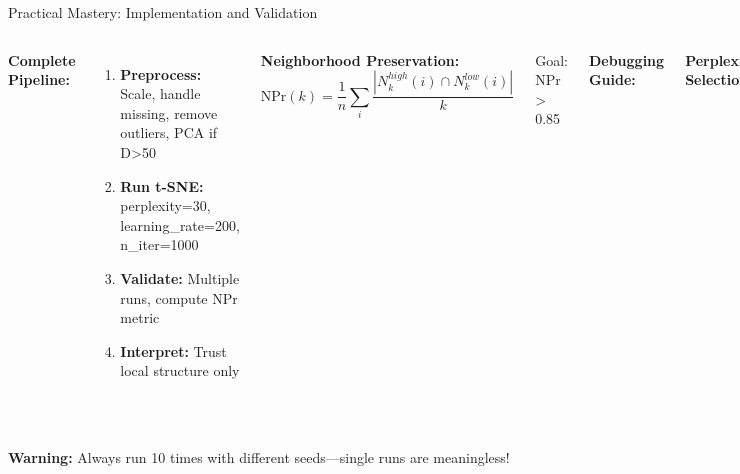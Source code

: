 \documentclass[aspectratio=169]{beamer}
\newcommand{\warning}[1]{\colorbox{red!10}{\textcolor{warningcolor}{\textbf{Warning:} #1}}}
\begin{document}
\begin{frame}{Practical Mastery: Implementation and Validation}
\begin{columns}
\textbf{Complete Pipeline:}

\begin{enumerate}
\item \textbf{Preprocess:} Scale, handle missing, remove outliers, PCA if D>50
\item \textbf{Run t-SNE:} perplexity=30, learning\_rate=200, n\_iter=1000
\item \textbf{Validate:} Multiple runs, compute NPr metric
\item \textbf{Interpret:} Trust local structure only
\end{enumerate}

\vspace{0.3cm}
\textbf{Neighborhood Preservation:}
$$\text{NPr}(k) = \frac{1}{n}\sum_i \frac{|N_k^{high}(i) \cap N_k^{low}(i)|}{k}$$

Goal: NPr > 0.85

\textbf{Debugging Guide:}


\vspace{0.3cm}
\textbf{Perplexity Selection:}
\begin{itemize}
\item n < 1000: perp = 5-30
\item n = 1000-10000: perp = 30-50
\item n > 10000: perp = 50-100
\end{itemize}
\end{columns}

\vspace{0.2cm}
\warning{Always run 10 times with different seeds—single runs are meaningless!}
\end{frame}
\end{document}
